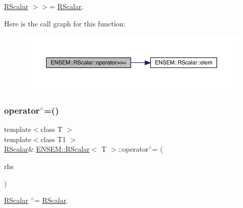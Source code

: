 \mbox{\hyperlink{classENSEM_1_1RScalar}{R\+Scalar}} $>$$>$= \mbox{\hyperlink{classENSEM_1_1RScalar}{R\+Scalar}}. 

Here is the call graph for this function\+:
\nopagebreak
\begin{figure}[H]
\begin{center}
\leavevmode
\includegraphics[width=350pt]{d0/d8c/classENSEM_1_1RScalar_a35379cd7317c2c533aa26e3c15a9b03f_cgraph}
\end{center}
\end{figure}
\mbox{\label{classENSEM_1_1RScalar_ad69bdf7cec58f8ef8a8a42b250d97b25}} 
\subsubsection{\texorpdfstring{operator$^\wedge$=()}{operator^=()}\hspace{0.1cm}{\footnotesize\ttfamily [1/3]}}
{\footnotesize\ttfamily template$<$class T $>$ \\
template$<$class T1 $>$ \\
\mbox{\hyperlink{classENSEM_1_1RScalar}{R\+Scalar}}\& \mbox{\hyperlink{classENSEM_1_1RScalar}{E\+N\+S\+E\+M\+::\+R\+Scalar}}$<$ T $>$\+::operator$^\wedge$= (\begin{DoxyParamCaption}\item[{const \mbox{\hyperlink{classENSEM_1_1RScalar}{R\+Scalar}}$<$ T1 $>$ \&}]{rhs }\end{DoxyParamCaption})\hspace{0.3cm}{\ttfamily [inline]}}



\mbox{\hyperlink{classENSEM_1_1RScalar}{R\+Scalar}} $^\wedge$= \mbox{\hyperlink{classENSEM_1_1RScalar}{R\+Scalar}}. 

